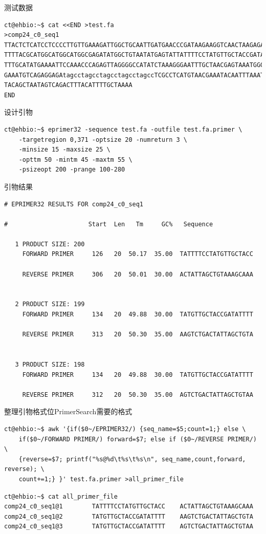 \documentclass[]{article}
\numberwithin{figure}{section}
\numberwithin{table}{section}
\begin{document}
测试数据

\begin{verbatim}
ct@ehbio:~$ cat <<END >test.fa
>comp24_c0_seq1
TTACTCTCATCCTCCCCTTGTTGAAAGATTGGCTGCAATTGATGAACCCGATAAGAAGGTCAACTAAGAGAAGTGTAC
TTTTACGCATGGCATGGCATGGCGAGATATGGCTGTAATATGAGTATTATTTTCCTATGTTGCTACCGATATTTTCTA
TTTGCATATGAAAATTCCAAACCCAGAGTTAGGGGCCATATCTAAAGGGAATTTGCTAACGAGTAAATGGGAAAATAG
GAAATGTCAGAGGAGAtagcctagcctagcctagcctagccTCGCCTCATGTAACGAAATACAATTTAAATTTTGCTT
TACAGCTAATAGTCAGACTTTACATTTTGCTAAAA
END
\end{verbatim}

设计引物

\begin{verbatim}
ct@ehbio:~$ eprimer32 -sequence test.fa -outfile test.fa.primer \
	-targetregion 0,371 -optsize 20 -numreturn 3 \
	-minsize 15 -maxsize 25 \
	-opttm 50 -mintm 45 -maxtm 55 \
	-psizeopt 200 -prange 100-280
\end{verbatim}

引物结果

\begin{verbatim}
# EPRIMER32 RESULTS FOR comp24_c0_seq1

#                      Start  Len   Tm     GC%   Sequence

   1 PRODUCT SIZE: 200
     FORWARD PRIMER     126   20  50.17  35.00  TATTTTCCTATGTTGCTACC

     REVERSE PRIMER     306   20  50.01  30.00  ACTATTAGCTGTAAAGCAAA


   2 PRODUCT SIZE: 199
     FORWARD PRIMER     134   20  49.88  30.00  TATGTTGCTACCGATATTTT

     REVERSE PRIMER     313   20  50.30  35.00  AAGTCTGACTATTAGCTGTA


   3 PRODUCT SIZE: 198
     FORWARD PRIMER     134   20  49.88  30.00  TATGTTGCTACCGATATTTT

     REVERSE PRIMER     312   20  50.30  35.00  AGTCTGACTATTAGCTGTAA
\end{verbatim}

整理引物格式位PrimerSearch需要的格式

\begin{verbatim}
ct@ehbio:~$ awk '{if($0~/EPRIMER32/) {seq_name=$5;count=1;} else \
	if($0~/FORWARD PRIMER/) forward=$7; else if ($0~/REVERSE PRIMER/) \
	{reverse=$7; printf("%s@%d\t%s\t%s\n", seq_name,count,forward, reverse); \
	count+=1;} }' test.fa.primer >all_primer_file
\end{verbatim}

\begin{verbatim}
ct@ehbio:~$ cat all_primer_file
comp24_c0_seq1@1        TATTTTCCTATGTTGCTACC    ACTATTAGCTGTAAAGCAAA
comp24_c0_seq1@2        TATGTTGCTACCGATATTTT    AAGTCTGACTATTAGCTGTA
comp24_c0_seq1@3        TATGTTGCTACCGATATTTT    AGTCTGACTATTAGCTGTAA
\end{verbatim}
\end{document}
